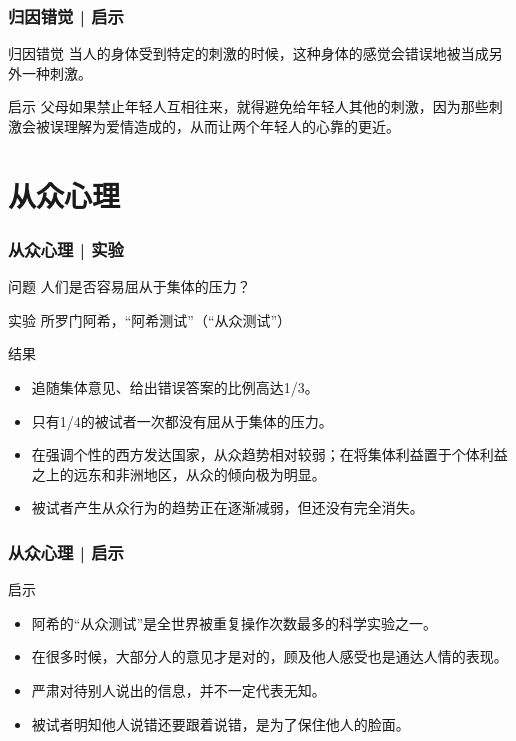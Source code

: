 \begin{frame}
  \frametitle{归因错觉 | 启示}
  \begin{block}{归因错觉}
    当人的身体受到特定的刺激的时候，这种身体的感觉会错误地被当成另外一种刺激。
  \end{block}
  \pause
  \begin{block}{启示}
  父母如果禁止年轻人互相往来，就得避免给年轻人其他的刺激，因为那些刺激会被误理解为爱情造成的，从而让两个年轻人的心靠的更近。
  \end{block}
\end{frame}

\section{从众心理}
\begin{frame}
  \frametitle{从众心理 | 实验}
  \begin{block}{问题}
    人们是否容易屈从于集体的压力？
  \end{block}
  \pause
  \begin{block}{实验}
    所罗门\textbullet 阿希，“阿希测试”（“从众测试”）
  \end{block}
  \pause
  \begin{block}{结果}
    \begin{itemize}
      \item 追随集体意见、给出错误答案的比例高达1/3。
      \item 只有1/4的被试者一次都没有屈从于集体的压力。
      \item 在强调个性的西方发达国家，从众趋势相对较弱；在将集体利益置于个体利益之上的远东和非洲地区，从众的倾向极为明显。
      \item 被试者产生从众行为的趋势正在逐渐减弱，但还没有完全消失。
    \end{itemize}
  \end{block}
\end{frame}

\begin{frame}
  \frametitle{从众心理 | 启示}
  \begin{block}{启示}
    \begin{itemize}
      \item 阿希的“从众测试”是全世界被重复操作次数最多的科学实验之一。
      \item 在很多时候，大部分人的意见才是对的，顾及他人感受也是通达人情的表现。
      \item 严肃对待别人说出的信息，并不一定代表无知。
      \item 被试者明知他人说错还要跟着说错，是为了保住他人的脸面。
    \end{itemize}
  \end{block}
\end{frame}

